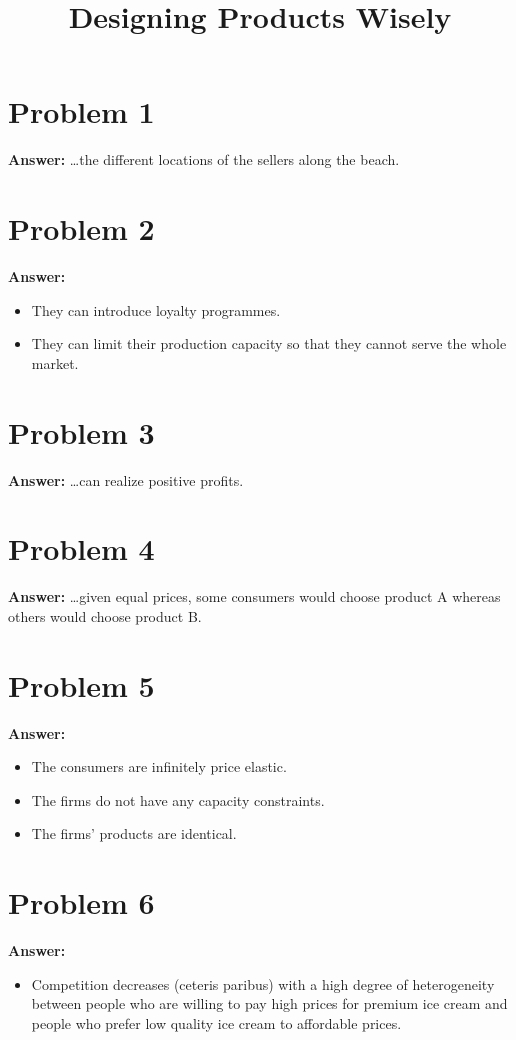 \documentclass[11pt]{article}
\date{}
\title{Designing Products Wisely}
\begin{document}
\thispagestyle{empty}
\pagestyle{empty}
\section*{Problem 1}
\label{sec:org8bd4e9d}

\textbf{Answer:} \ldots{}the different locations of the sellers along the beach.
\section*{Problem 2}
\label{sec:orgd10ba36}

\textbf{Answer:}
\begin{itemize}
\item They can introduce loyalty programmes.
\item They can limit their production capacity so that they cannot serve the
whole market.
\end{itemize}
\section*{Problem 3}
\label{sec:org093bbff}

\textbf{Answer:} \ldots{}can realize positive profits.
\section*{Problem 4}
\label{sec:org8cba297}

\textbf{Answer:} \ldots{}given equal prices, some consumers would choose product A
whereas others would choose product B.
\section*{Problem 5}
\label{sec:orgefa872e}

\textbf{Answer:}
\begin{itemize}
\item The consumers are infinitely price elastic.
\item The firms do not have any capacity constraints.
\item The firms' products are identical.
\end{itemize}
\section*{Problem 6}
\label{sec:org2fdd351}

\textbf{Answer:}
\begin{itemize}
\item Competition decreases (ceteris paribus) with a high degree of
heterogeneity between people who are willing to pay high prices for
premium ice cream and people who prefer low quality ice cream to
affordable prices.
\end{itemize}
\end{document}
